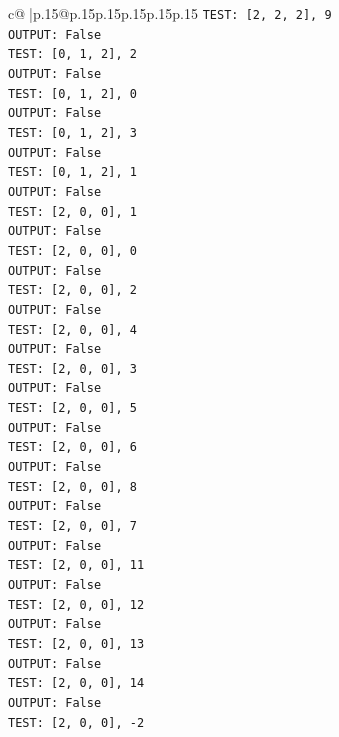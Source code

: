 \documentclass{article}
\begin{document}
{\begin{supertabular}{c@{$\;$}|p{.15\linewidth}@{}p{.15\linewidth}p{.15\linewidth}p{.15\linewidth}p{.15\linewidth}p{.15\linewidth}}
{{{\texttt{TEST: {[}2, 2, 2{]}, 9} \\
\texttt{OUTPUT: False} \\
\texttt{TEST: {[}0, 1, 2{]}, 2} \\
\texttt{OUTPUT: False} \\
\texttt{TEST: {[}0, 1, 2{]}, 0} \\
\texttt{OUTPUT: False} \\
\texttt{TEST: {[}0, 1, 2{]}, 3} \\
\texttt{OUTPUT: False} \\
\texttt{TEST: {[}0, 1, 2{]}, 1} \\
\texttt{OUTPUT: False} \\
\texttt{TEST: {[}2, 0, 0{]}, 1} \\
\texttt{OUTPUT: False} \\
\texttt{TEST: {[}2, 0, 0{]}, 0} \\
\texttt{OUTPUT: False} \\
\texttt{TEST: {[}2, 0, 0{]}, 2} \\
\texttt{OUTPUT: False} \\
\texttt{TEST: {[}2, 0, 0{]}, 4} \\
\texttt{OUTPUT: False} \\
\texttt{TEST: {[}2, 0, 0{]}, 3} \\
\texttt{OUTPUT: False} \\
\texttt{TEST: {[}2, 0, 0{]}, 5} \\
\texttt{OUTPUT: False} \\
\texttt{TEST: {[}2, 0, 0{]}, 6} \\
\texttt{OUTPUT: False} \\
\texttt{TEST: {[}2, 0, 0{]}, 8} \\
\texttt{OUTPUT: False} \\
\texttt{TEST: {[}2, 0, 0{]}, 7} \\
\texttt{OUTPUT: False} \\
\texttt{TEST: {[}2, 0, 0{]}, 11} \\
\texttt{OUTPUT: False} \\
\texttt{TEST: {[}2, 0, 0{]}, 12} \\
\texttt{OUTPUT: False} \\
\texttt{TEST: {[}2, 0, 0{]}, 13} \\
\texttt{OUTPUT: False} \\
\texttt{TEST: {[}2, 0, 0{]}, 14} \\
\texttt{OUTPUT: False} \\
\texttt{TEST: {[}2, 0, 0{]}, {-}2} \\
}}}
\end{supertabular}}
\end{document}

